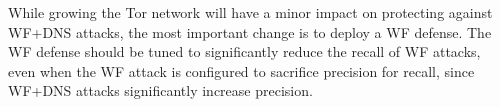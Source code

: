 While growing the Tor network will have a minor impact on protecting against
WF+DNS attacks, the most important change is to deploy a WF defense. The
WF defense should be tuned to significantly reduce the recall of WF attacks,
even when the WF attack is configured to sacrifice precision for recall, since
WF+DNS attacks significantly increase precision.
